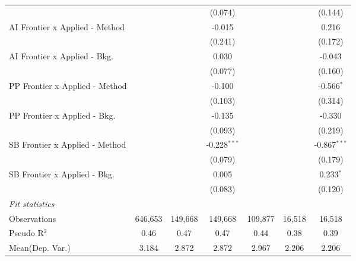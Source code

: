 \begin{tabular}{lcccccc}
                                  &                &                & (0.074)        &                &               & (0.144)\\   
   AI Frontier x Applied - Method &                &                & -0.015         &                &               & 0.216\\   
                                  &                &                & (0.241)        &                &               & (0.172)\\   
   AI Frontier x Applied - Bkg.   &                &                & 0.030          &                &               & -0.043\\   
                                  &                &                & (0.077)        &                &               & (0.160)\\   
   PP Frontier x Applied - Method &                &                & -0.100         &                &               & -0.566$^{*}$\\   
                                  &                &                & (0.103)        &                &               & (0.314)\\   
   PP Frontier x Applied - Bkg.   &                &                & -0.135         &                &               & -0.330\\   
                                  &                &                & (0.093)        &                &               & (0.219)\\   
   SB Frontier x Applied - Method &                &                & -0.228$^{***}$ &                &               & -0.867$^{***}$\\   
                                  &                &                & (0.079)        &                &               & (0.179)\\   
   SB Frontier x Applied - Bkg.   &                &                & 0.005          &                &               & 0.233$^{*}$\\   
                                  &                &                & (0.083)        &                &               & (0.120)\\   
   \midrule
   \emph{Fit statistics}\\
   Observations                   & 646,653        & 149,668        & 149,668        & 109,877        & 16,518        & 16,518\\  
   Pseudo R$^2$                   & 0.46           & 0.47           & 0.47           & 0.44           & 0.38          & 0.39\\  
Mean(Dep. Var.) & 3.184 & 2.872 & 2.872 & 2.967 & 2.206 & 2.206 \\
   

\end{tabular}
